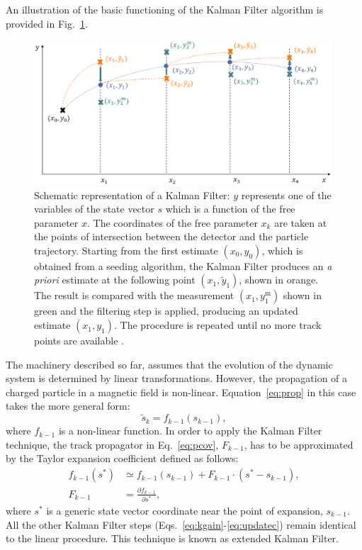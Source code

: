 An illustration of the basic functioning of the Kalman Filter algorithm is provided in Fig.~\ref{fig:KFdiagramfinal}.

\begin{figure}[t]
     \centering
     \includegraphics[width=0.99\textwidth]{figures/ch2-Theory/KFdiagram_final.eps}
     \caption[Schematic representation of a Kalman Filter]{Schematic representation of a Kalman Filter: $y$ represents one of the variables of the state vector $s$ which is a function of the free parameter $x$. The coordinates of the free parameter $x_k$ are taken at the points of intersection between the detector and the particle trajectory. Starting from the first estimate $(x_0,y_0)$, which is obtained from a seeding algorithm, the Kalman Filter produces an \textit{a priori} estimate at the following point $(x_1,\widetilde{y}_1)$, shown in orange. The result is compared with the measurement $(x_1,y_1^\textrm{m})$ shown in green and the filtering step is applied, producing an updated estimate $(x_1,y_1)$. The procedure is repeated until no more track points are available \cite{Battisti:2024nqq}.}
        \label{fig:KFdiagramfinal}
\end{figure}

The machinery described so far, assumes that the evolution of the dynamic system is determined by linear transformations. However, the propagation of a charged particle in a magnetic field is non-linear. Equation~\ref{eq:prop} in this case takes the more general form:
\begin{equation}\label{eq:EKF}
    \widetilde{s}_k=f_{k-1}\left(s_{k-1}\right),
\end{equation}
where $f_{k-1}$ is a non-linear function. In order to apply the Kalman Filter technique, the track propagator in Eq.~\ref{eq:pcov}, $F_{k-1}$, has to be approximated by the Taylor expansion coefficient defined as follows:
\begin{align}
    f_{k-1}\left(s^*\right)& \simeq f_{k-1}\left({s}_{k-1}\right) + F_{k-1}\cdot\left(s^*-{s}_{k-1}\right), \label{eq:jacobian} \\
    F_{k-1}&=\frac{\partial f_{k-1} }{ \partial s^*},\label{eq:jacobian2}
\end{align}
where $s^*$ is a generic state vector coordinate near the point of expansion, $s_{k-1}$. All the other Kalman Filter steps (Eqs.~\ref{eq:kgain}-\ref{eq:updatec}) remain identical to the linear procedure. This technique is known as extended Kalman Filter. 

